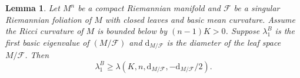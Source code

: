 \documentclass[11pt]{amsart}
\newtheorem{lemma}[theorem]{Lemma}
\def\d{\mathrm{d}}
\begin{document}
\begin{lemma}\label{999}
    Let $M^n$ be a compact Riemannian manifold and $\mathcal{F}$ be a singular Riemannian foliation of $M$ with closed leaves and basic mean curvature. Assume the Ricci curvature of $M$ is bounded below by $(n-1)K>0$. Suppose $\lambda_1^B$ is the first basic eigenvalue of $(M/\mathcal{F})$ and $\d_{M/\mathcal{F}}$ is the diameter of the leaf space $M/\mathcal{F}$. Then $$\lambda_1^B\geq \lambda(K,n,\d_{M/\mathcal{F}},-\d_{M/\mathcal{F}}/2).$$ %
\end{lemma}
\end{document}
